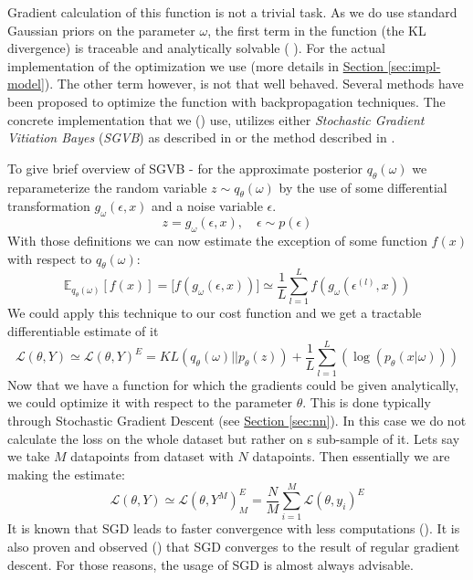 \documentclass[12pt,a4paper,twoside]{scrartcl}
\numberwithin{equation}{section}
\newcommand{\refsec}[1]{\hyperref[#1]{Section \ref*{#1}}}
\begin{document}
Gradient calculation of this function is not a trivial task. As we do use standard Gaussian priors on the parameter \(\omega\), the first term in the function (the KL divergence) is traceable and analytically solvable (\cite{paisley2012} ). For the actual implementation of the optimization we use \cite{tf} (more details in \refsec{sec:impl-model}). The other term however, is not that well behaved. Several methods have been proposed to optimize the function with backpropagation techniques. The concrete implementation that we (\cite{edward}) use, utilizes either \emph{Stochastic Gradient Vitiation Bayes} (\emph{SGVB}) as described in \cite{kingma2013} or the method described in \cite{paisley2012}. 
 

To give brief overview of SGVB - for the approximate posterior \(q_{\theta}(\omega)\) we reparameterize the random variable \(z \sim q_{\theta}(\omega)\) by the use of some differential transformation \(g_{\omega}(\epsilon , x)\) and a noise variable \(\epsilon\).
\begin{equation}
  z =  g_{\omega}(\epsilon , x), \quad \epsilon \sim p(\epsilon)
\end{equation}
With those definitions we can now estimate the exception of some function \(f(x)\) with respect to \(q_{\theta}(\omega)\):
\begin{equation}
  \mathbb{E}_{q_{\theta}(\omega)}[f(x)] = \mathbb[f(g_{\omega}(\epsilon , x))] \simeq \frac{1}{L}\sum_{l=1}^L f(g_{\omega}(\epsilon^{(l)} , x))
\end{equation}
We could apply this technique to our cost function and we get a tractable  differentiable  estimate of it
\begin{equation}
  \mathcal{L}(\theta, Y) \simeq \mathcal{L}(\theta,Y)^E = KL(q_{\theta}(\omega)||p_{\theta}(z))  + \frac{1}{L}\sum_{l=1}^L(\log(p_{\theta}(x|\omega)))
\end{equation}
Now that we have a function for which the gradients could be given analytically, we could optimize it with respect to the parameter \(\theta\). This is done typically through Stochastic Gradient Descent (see \refsec{sec:nn}). In this case we do not calculate the loss on the whole dataset but rather on s sub-sample of it. Lets say we take \(M\) datapoints from dataset with \(N\) datapoints. Then essentially we are making the estimate:
\begin{equation}
  \mathcal{L}(\theta, Y) \simeq \mathcal{L}(\theta, Y^M)^E_M = \frac{N}{M}  \sum_{i=1}^{M}\mathcal{L}(\theta, y_i)^E
\end{equation}
It is known that SGD leads to faster convergence with less computations (\cite{robbins1951}). It is also proven and observed (\cite{shapiro1996}) that SGD converges to the result of regular gradient descent. For those reasons, the usage of SGD is almost always advisable.
\end{document}
